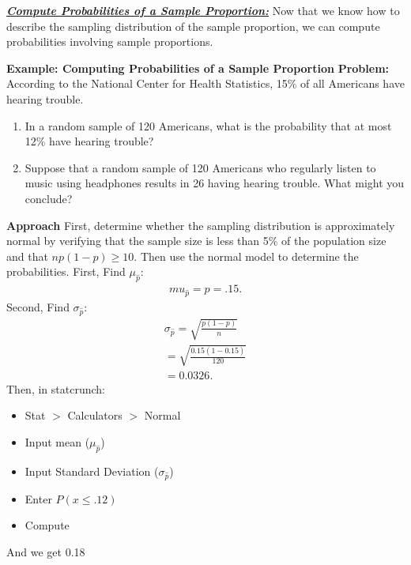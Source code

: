 \documentclass{report}
\begin{document}
        \bigbreak \noindent \bigbreak \noindent 
        \textbf{\textit{\underline{Compute Probabilities of a Sample Proportion:}}}
        \bigbreak \noindent 
        Now that we know how to describe the sampling distribution of the sample proportion, we can compute probabilities involving sample proportions.
        \bigbreak \noindent 
        \begin{mdframed}
          \textbf{Example: Computing Probabilities of a Sample Proportion}
          \bigbreak \noindent 
          \textbf{Problem:}
          \bigbreak \noindent 
          According to the National Center for Health Statistics, 15\% of all Americans have hearing trouble.
          \begin{enumerate}
              \item In a random sample of 120 Americans, what is the probability that at most 12\% have hearing trouble?
              \item Suppose that a random sample of 120 Americans who regularly listen to music using headphones results in 26 having hearing trouble. What might you conclude?
          \end{enumerate}
          \bigbreak \noindent 
          \textbf{Approach}
          \bigbreak \noindent 
          First, determine whether the sampling distribution is approximately normal by verifying that the sample size is less than 5\% of the population size and that $np(1−p) \geq 10$. Then use the normal model to determine the probabilities.
          \bigbreak \noindent 
          First, Find $\mu_{\hat{p}}:$
          \begin{align*}
              mu_{\hat{p}} = p = .15
          .\end{align*}
          Second, Find $\sigma_{\hat{p}}:$
          \begin{align*}
              \sigma_{\hat{p}} = \sqrt{\frac{p(1-p)}{n}} \\
              = \sqrt{\frac{0.15(1-0.15)}{120}} \\
              = 0.0326
          .\end{align*}
          \bigbreak \noindent 
          Then, in statcrunch:
          \begin{itemize}
              \item Stat $> $ Calculators $> $ Normal
                \item Input mean ($\mu_{\hat{p}} $)
                \item Input Standard Deviation ($\sigma_{\hat{p}} $)
                \item Enter $P(x \leq .12) $
                \item Compute
          \end{itemize}
          \bigbreak \noindent 
          And we get 0.18
        \end{mdframed}
\end{document}
